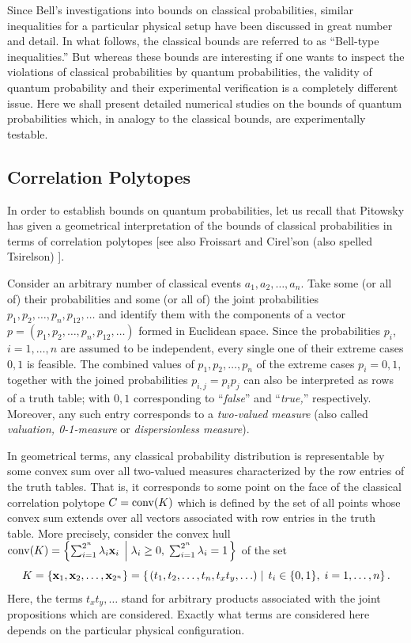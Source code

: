 Since Bell's investigations \cite{bell-87,clauser,peres} into bounds on classical probabilities,
similar inequalities for a particular physical setup have
been discussed in great number and detail.
In what follows, the classical bounds are referred to as ``Bell-type inequalities.''
But whereas these bounds are interesting
if one wants to inspect
the violations of classical probabilities by quantum probabilities,
the validity of quantum probability and their experimental verification is a completely
different issue.
Here we shall present detailed numerical studies on the bounds of quantum probabilities which,
in analogy to the classical bounds, are experimentally testable.

\subsection{Correlation Polytopes}

In order to establish bounds on quantum probabilities, let us recall that
Pitowsky has given a geometrical interpretation of the bounds of classical probabilities
in terms of correlation polytopes \cite{pitowsky-86,pitowsky,pitowsky-89a,Pit-91,Pit-94}
[see also Froissart \cite{froissart-81} and
Cirel'son (also spelled Tsirelson) \cite{cirelson:80,cirelson}].

Consider an arbitrary number of classical events $a_1, a_2,\ldots , a_n$.
Take some (or all of) their probabilities
and some (or all of) the joint probabilities
$p_1, p_2,\ldots , p_n, p_{12},\ldots $
and identify them with the components of
a vector  $p=(p_1, p_2,\ldots , p_n, p_{12},\ldots )$
formed in Euclidean space.
Since the probabilities $p_i$, $i=1,\ldots ,n$ are assumed to be independent,
every single one of their extreme cases $0,1$ is feasible.
The combined values of $p_1, p_2,\ldots , p_n$ of the extreme cases $p_i=0,1$,
together with the joined probabilities $p_{i,j} =p_i p_j$
can also be interpreted as rows of a truth table; with $0,1$ corresponding to
``{\it false}'' and
``{\it true,}'' respectively.
Moreover, any such entry corresponds to a {\em two-valued measure}
(also called {\em valuation, 0-1-measure} or {\em dispersionless measure}).

In geometrical terms,
any classical probability distribution is representable by some convex sum over
all two-valued measures characterized by the row entries of the truth tables.
That is, it corresponds to
some point on the face of the classical correlation polytope $C={\rm conv} (K)$
which is defined by the set of all points whose
convex sum extends over all vectors associated with row entries in the truth table.
More precisely,
consider the convex hull
${\rm conv} (K)=\left\{ \sum_{i=1}^{2^n} \lambda_i{\bf x}_i
  \; \left|  \;
\lambda_i\ge 0,\; \sum_{i=1}^{2^n}\lambda_i =1
\right.
\right\} $
of the set
$$K
=\{{\bf x}_1,{\bf x}_2,\ldots ,{\bf x}_{2^n}\}
= \left\{
\left.
\large(t_1, t_2,\ldots , t_n, t_xt_y,\ldots \large)
\; \right| \;
t_i \in \{0,1\},\; i=1,\ldots ,n
\right\}.$$
Here, the terms $t_xt_y,\ldots$ stand for arbitrary products associated with
the joint propositions which are considered. Exactly what terms  are
considered here depends on the particular physical configuration.

